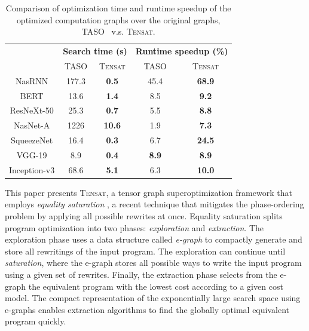 \documentclass{article}
\newcommand{\ourname}[0]{\textsc{Tensat}}
\begin{document}
\begin{table}[]
    \centering
    \footnotesize
    \begin{tabular}{ccc|cc}
    \toprule
    & \multicolumn{2}{c|}{\bf Search time (s)} & \multicolumn{2}{c}{\bf Runtime speedup (\%)} \\
    & TASO & \ourname{} & TASO & \ourname{} \\
    \midrule
    NasRNN & 177.3 & \textbf{0.5} & 45.4 & \textbf{68.9} \\
    BERT & 13.6 & \textbf{1.4} & 8.5 & \textbf{9.2} \\
    ResNeXt-50 & 25.3 & \textbf{0.7} & 5.5 & \textbf{8.8} \\
    NasNet-A & 1226 & \textbf{10.6} & 1.9 & \textbf{7.3} \\
    SqueezeNet & 16.4 & \textbf{0.3} & 6.7 & \textbf{24.5} \\
    VGG-19 & 8.9 & \textbf{0.4} & \textbf{8.9} & \textbf{8.9} \\
    Inception-v3 & 68.6 & \textbf{5.1} & 6.3 & \textbf{10.0} \\
    \bottomrule
    \end{tabular}
    \caption{Comparison of optimization time and runtime speedup of the optimized computation graphs over the original graphs, TASO~\cite{taso} v.s. \ourname{}.}
    \label{table:ngraph}
\end{table}


This paper presents \ourname{}, a tensor graph superoptimization framework that employs \emph{equality saturation} \cite{eqsat, eqsat-llvm, egg},
a recent technique that mitigates the phase-ordering problem by
applying all possible rewrites at once.  %
Equality saturation splits program optimization into two phases: {\em exploration} and {\em extraction}.
The exploration phase uses a data structure called \emph{e-graph} to compactly generate and store all rewritings of the input program.
The exploration can continue until \emph{saturation}, 
where the e-graph stores all possible ways to write the input program using a given set of rewrites.
Finally, the extraction phase selects from the e-graph the equivalent program with the lowest cost according to a given cost model. The compact representation of the exponentially large search space using e-graphs enables extraction algorithms to find the globally optimal equivalent program quickly.
\end{document}
